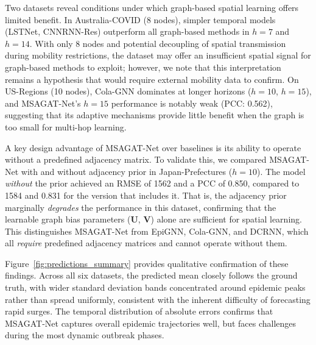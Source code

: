 \documentclass[final,1p,times]{elsarticle}
\begin{document}
Two datasets reveal conditions under which graph-based spatial learning offers limited benefit. In Australia-COVID (8 nodes), simpler temporal models (LSTNet, CNNRNN-Res) outperform all graph-based methods in $h{=}7$ and $h{=}14$. With only 8 nodes and potential decoupling of spatial transmission during mobility restrictions, the dataset may offer an insufficient spatial signal for graph-based methods to exploit; however, we note that this interpretation remains a hypothesis that would require external mobility data to confirm. On US-Regions (10 nodes), Cola-GNN dominates at longer horizons ($h{=}10$, $h{=}15$), and MSAGAT-Net's $h{=}15$ performance is notably weak (PCC: 0.562), suggesting that its adaptive mechanisms provide little benefit when the graph is too small for multi-hop learning.

A key design advantage of MSAGAT-Net over baselines is its ability to operate without a predefined adjacency matrix. To validate this, we compared MSAGAT-Net with and without adjacency prior in Japan-Prefectures ($h{=}10$). The model \emph{without} the prior achieved an RMSE of 1562 and a PCC of 0.850, compared to 1584 and 0.831 for the version that includes it. That is, the adjacency prior marginally \emph{degrades} the performance in this dataset, confirming that the learnable graph bias parameters ($\mathbf{U}$, $\mathbf{V}$) alone are sufficient for spatial learning. This distinguishes MSAGAT-Net from EpiGNN, Cola-GNN, and DCRNN, which all \emph{require} predefined adjacency matrices and cannot operate without them.

Figure~\ref{fig:predictions_summary} provides qualitative confirmation of these findings. Across all six datasets, the predicted mean closely follows the ground truth, with wider standard deviation bands concentrated around epidemic peaks rather than spread uniformly, consistent with the inherent difficulty of forecasting rapid surges. The temporal distribution of absolute errors confirms that MSAGAT-Net captures overall epidemic trajectories well, but faces challenges during the most dynamic outbreak phases.
\end{document}
